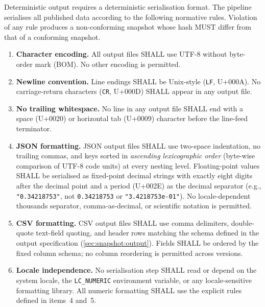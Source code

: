 Deterministic output requires a deterministic serialisation format.  The
\ISI pipeline serialises all published data according to the following
normative rules.  Violation of any rule produces a non-conforming snapshot
whose hash MUST differ from that of a conforming snapshot.

\begin{enumerate}
  \item \textbf{Character encoding.}  All output files SHALL use UTF-8
    without byte-order mark (BOM).  No other encoding is permitted.

  \item \textbf{Newline convention.}  Line endings SHALL be Unix-style
    (\texttt{LF}, U+000A).  No carriage-return characters (\texttt{CR},
    U+000D) SHALL appear in any output file.

  \item \textbf{No trailing whitespace.}  No line in any output file
    SHALL end with a space (U+0020) or horizontal tab (U+0009) character
    before the line-feed terminator.

  \item \textbf{JSON formatting.}  JSON output files SHALL use two-space
    indentation, no trailing commas, and keys sorted in \emph{ascending
    lexicographic order} (byte-wise comparison of UTF-8 code units) at
    every nesting level.  Floating-point values SHALL be serialised as
    fixed-point decimal strings with exactly eight digits after the
    decimal point and a period (U+002E) as the decimal separator
    (e.g., \texttt{"0.34218753"}, not \texttt{0.34218753} or
    \texttt{"3.4218753e-01"}).  No locale-dependent thousands separator,
    comma-as-decimal, or scientific notation is permitted.

  \item \textbf{CSV formatting.}  CSV output files SHALL use comma
    delimiters, double-quote text-field quoting, and header rows matching
    the schema defined in the output specification
    (\cref{sec:snapshot:output}).  Fields SHALL be ordered by the fixed
    column schema; no column reordering is permitted across versions.

  \item \textbf{Locale independence.}  No serialisation step SHALL read
    or depend on the system locale, the \texttt{LC\_NUMERIC} environment
    variable, or any locale-sensitive formatting library.  All numeric
    formatting SHALL use the explicit rules defined in items~4 and~5.


\end{enumerate}
